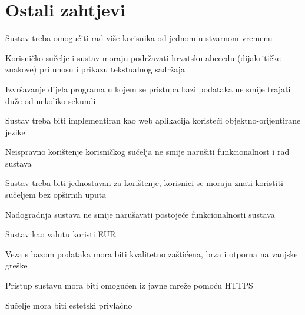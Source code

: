 				\eject
	
		\section{Ostali zahtjevi}
		
			\begin{packed_item}
	
						\item Sustav treba omogućiti rad više korisnika od jednom u stvarnom vremenu
						\item Korisničko sučelje i sustav moraju podržavati hrvatsku abecedu (dijakritičke znakove) pri unosu i prikazu tekstualnog sadržaja
						
						\item Izvršavanje dijela programa u kojem se pristupa bazi podataka ne smije trajati duže od nekoliko sekundi
						
						\item Sustav treba biti implementiran kao web aplikacija koristeći objektno-orijentirane jezike
						
						\item Neispravno korištenje korisničkog sučelja ne smije narušiti funkcionalnost i rad sustava
						
						\item Sustav treba biti jednostavan za korištenje, korisnici se moraju znati koristiti sučeljem bez opširnih uputa
						
						\item Nadogradnja sustava ne smije narušavati postojeće funkcionalnosti sustava
						
						\item Sustav kao valutu koristi EUR
						
						\item Veza s bazom podataka mora biti kvalitetno zaštićena, brza i otporna na vanjske greške
						
						\item Pristup sustavu mora biti omogućen iz javne mreže pomoću HTTPS
						\item Sučelje mora biti estetski privlačno
						
					
						
						
						
			\end{packed_item}
			
			 
	